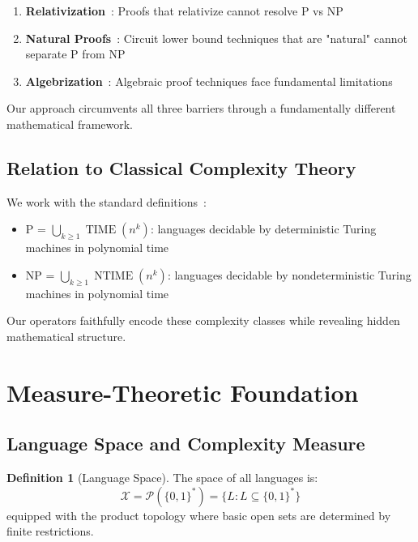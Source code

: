 \documentclass[12pt]{article}
\theoremstyle{plain}
\theoremstyle{definition}
\newtheorem{definition}[theorem]{Definition}
\DeclareMathOperator{\TIME}{TIME}
\DeclareMathOperator{\NTIME}{NTIME}
\begin{document}
\begin{enumerate}
\item \textbf{Relativization}~\cite{baker1975relativizations}: Proofs that relativize cannot resolve P vs NP
\item \textbf{Natural Proofs}~\cite{razborov1997natural}: Circuit lower bound techniques that are "natural" cannot separate P from NP
\item \textbf{Algebrization}~\cite{aaronson2008algebrization}: Algebraic proof techniques face fundamental limitations
\end{enumerate}

Our approach circumvents all three barriers through a fundamentally different mathematical framework.

\subsection{Relation to Classical Complexity Theory}

We work with the standard definitions~\cite{arora2009computational,papadimitriou1994computational,sipser2012introduction}:
\begin{itemize}
\item P = $\bigcup_{k \geq 1} \TIME(n^k)$: languages decidable by deterministic Turing machines in polynomial time
\item NP = $\bigcup_{k \geq 1} \NTIME(n^k)$: languages decidable by nondeterministic Turing machines in polynomial time
\end{itemize}

Our operators faithfully encode these complexity classes while revealing hidden mathematical structure.

\section{Measure-Theoretic Foundation}

\subsection{Language Space and Complexity Measure}

\begin{definition}[Language Space]
The space of all languages is:
\begin{equation}
\mathcal{X} = \mathcal{P}(\{0,1\}^*) = \{L : L \subseteq \{0,1\}^*\}
\end{equation}
equipped with the product topology where basic open sets are determined by finite restrictions.
\end{definition}
\end{document}
